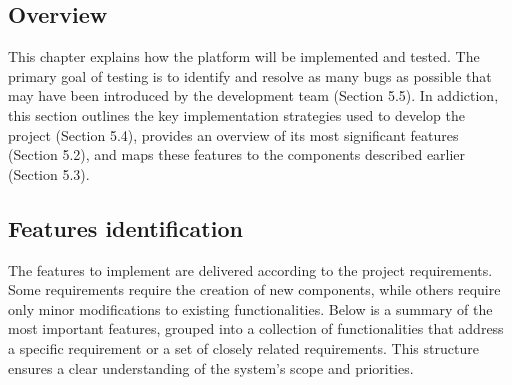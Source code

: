 \subsection{Overview}
This chapter explains how the platform will be implemented and tested. The primary goal of testing is to identify and resolve as many bugs as possible that may have been introduced by the development team (Section 5.5). In addiction, this section outlines the key implementation strategies used to develop the project (Section 5.4), provides an overview of  its most significant features (Section 5.2), and maps these features to the components described earlier (Section 5.3).

\subsection{Features identification}
The features to implement are delivered according to the project requirements. Some requirements require the creation of new components, while others require only minor modifications to existing functionalities. Below is a summary of the most important features, grouped into a collection of functionalities that address a specific requirement or a set of closely related requirements. This structure ensures a clear understanding of the system's scope and priorities.

